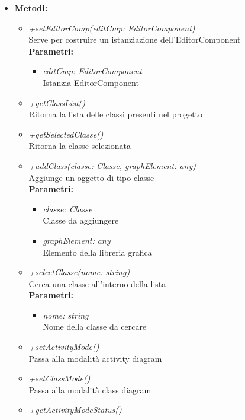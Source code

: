 \begin{itemize}
\begin{itemize}
		\end{itemize}
	\item \textbf{Metodi:}
		\begin{itemize}
			\item \emph{+setEditorComp(editCmp: EditorComponent)}\\
    		Serve per costruire un istanziazione dell'EditorComponent\\
    		\textbf{Parametri:}
    		\begin{itemize}
    			\item \emph{editCmp: EditorComponent}\\
    			Istanzia EditorComponent
    		\end{itemize}
    		\item \emph{+getClassList()}\\
    		Ritorna la lista delle classi presenti nel progetto
    		\item \emph{+getSelectedClasse()}\\
    		Ritorna la classe selezionata
    		\item \emph{+addClass(classe: Classe, graphElement: any)}\\
    		Aggiunge un oggetto di tipo classe\\
    		\textbf{Parametri:}
    		\begin{itemize}
    			\item \emph{classe: Classe}\\
    			Classe da aggiungere
    			\item \emph{graphElement: any}\\
    			Elemento della libreria grafica
    		\end{itemize}
    		\item \emph{+selectClasse(nome: string)}\\
    		Cerca una classe all'interno della lista\\
    		\textbf{Parametri:}
    		\begin{itemize}
    			\item \emph{nome: string}\\
    			Nome della classe da cercare
    		\end{itemize}
    		\item \emph{+setActivityMode()}\\
    		Passa alla modalità activity diagram
    		\item \emph{+setClassMode()}\\
    		Passa alla modalità class diagram
    		\item \emph{+getActivityModeStatus()}\\

\end{itemize}
\end{itemize}
